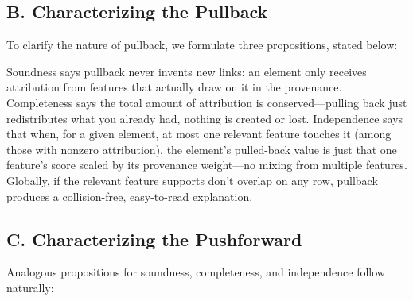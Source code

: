 \subsection*{B. Characterizing the Pullback}

To clarify the nature of pullback, we formulate three propositions, stated below:




Soundness says pullback never invents new links: an element only receives attribution from features that actually draw on it in the provenance. Completeness says the total amount of attribution is conserved—pulling back just redistributes what you already had, nothing is created or lost. Independence says that when, for a given element, at most one relevant feature touches it (among those with nonzero attribution), the element’s pulled-back value is just that one feature’s score scaled by its provenance weight—no mixing from multiple features. Globally, if the relevant feature supports don’t overlap on any row, pullback produces a collision-free, easy-to-read explanation.

\subsection*{C. Characterizing the Pushforward}

Analogous propositions for soundness, completeness, and independence follow naturally:


